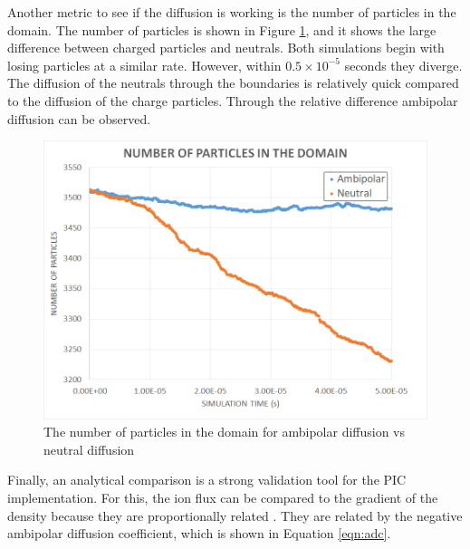 \indent Another metric to see if the diffusion is working is the number of particles in the domain. The number of particles is shown in Figure \ref{fig:ambipolarexcel}, and it shows the large difference between charged particles and neutrals. Both simulations begin with losing particles at a similar rate. However, within \(0.5 \times 10^{-5}\) seconds they diverge. The diffusion of the neutrals through the boundaries is relatively quick compared to the diffusion of the charge particles. Through the relative difference ambipolar diffusion can be observed. \par

\begin{figure}
\includegraphics[width=.85\textwidth]{figures/num_particles.png}
\centering
\caption[Number of Particles in Diffusion]{The number of particles in the domain for ambipolar diffusion vs neutral diffusion}
\label{fig:ambipolarexcel}
\end{figure}

\indent Finally, an analytical comparison is a strong validation tool for the PIC implementation. For this, the ion flux can be compared to the gradient of the density because they are proportionally related \cite{gobel}. They are related by the negative ambipolar diffusion coefficient, which is shown in Equation \ref{eqn:adc}. \par

